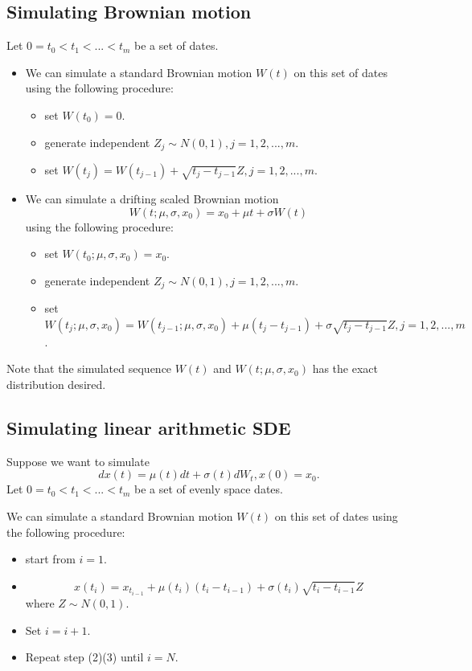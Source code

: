 \begin{refsection}
\subsection{Simulating Brownian motion}
\begin{method}\cite[705]{campolieti2016financial}
Let $0=t_0<t_1<...<t_m$ be a set of dates.
\begin{itemize}
	\item We can simulate a standard Brownian motion $W(t)$ on this set of dates using the following procedure:
	\begin{itemize}
		\item set $W(t_0) = 0$.
		\item generate independent $Z_j\sim N(0,1), j=1,2,...,m$.
		\item set $W(t_j) = W(t_{j-1}) + \sqrt{t_j-t_{j-1}}Z,j=1,2,...,m$.
	\end{itemize}
	\item We can simulate a drifting scaled Brownian motion $$W(t;\mu,\sigma,x_0) = x_0+\mu t + \sigma W(t)$$
	using the following procedure:
	\begin{itemize}
		\item set $W(t_0;\mu,\sigma,x_0) = x_0$.
		\item generate independent $Z_j\sim N(0,1), j=1,2,...,m$.
		\item set $W(t_j;\mu,\sigma,x_0) = W(t_{j-1};\mu,\sigma,x_0) + \mu(t_j-t_{j-1})+\sigma\sqrt{t_j-t_{j-1}}Z,j=1,2,...,m$.
	\end{itemize}
\end{itemize}	

Note that the simulated sequence $W(t)$ and $W(t;\mu,\sigma,x_0)$ has the exact distribution desired.
\end{method}


\subsection{Simulating linear arithmetic SDE}

\begin{method}\cite[104]{glasserman2003monte}
Suppose we want to simulate
$$dx(t) = \mu(t)dt + \sigma(t)dW_t, x(0) = x_0.$$
Let $0=t_0<t_1<...<t_m$ be a set of evenly space dates.

We can simulate a standard Brownian motion $W(t)$ on this set of dates using the following procedure:
	\begin{itemize}
		\item start from $i=1$.
		\item $$x(t_{i}) = x_{t_{i-1}} + \mu(t_i)(t_{i}-t_{i-1}) + \sigma(t_i)\sqrt{t_{i}-t_{i-1}}Z$$
		where $Z\sim N(0,1)$.
		\item Set $i=i+1$.
		\item Repeat step (2)(3) until $i=N$.
	\end{itemize}
\end{method}





\end{refsection}

